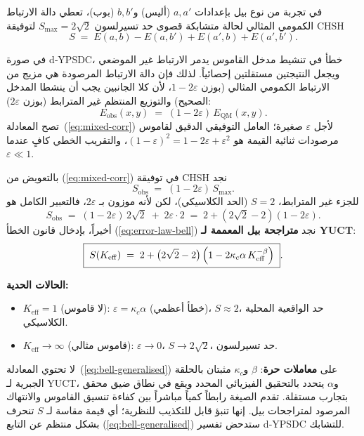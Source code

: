 \documentclass[12pt,a4paper]{article}
\theoremstyle{remark}
\begin{document}
	في تجربة من نوع بيل بإعدادات \(a,a'\) (أليس) و\(b,b'\) (بوب)، تعطي دالة الارتباط الكمومي المثالي لحالة متشابكة قصوى حد تسيرلسون \(S_{\max}=2\sqrt{2}\) لتوفيقة CHSH
	\[
	S \;=\; E(a,b)-E(a,b')+E(a',b)+E(a',b').
	\]
	
	في صورة d‑YPSDC، خطأ في تنشيط مدخل القاموس يدمر الارتباط غير الموضعي ويجعل النتيجتين مستقلتين إحصائياً. لذلك فإن دالة الارتباط المرصودة هي مزيج من الارتباط الكمومي المثالي (بوزن \(1-2\varepsilon\)، لأن كلا الجانبين يجب أن ينشطا المدخل الصحيح) والتوزيع المنتظم غير المترابط (بوزن \(2\varepsilon\)):
	\begin{equation}
		E_{\mathrm{obs}}(x,y) \;=\; (1-2\varepsilon)\,E_{\mathrm{QM}}(x,y).
		\label{eq:mixed-corr}
	\end{equation}
	تصح المعادلة~(\ref{eq:mixed-corr}) لأجل \(\varepsilon\) صغيرة؛ العامل التوفيقي الدقيق لقاموس مرصودات ثنائية القيمة هو \((1-\varepsilon)^2 = 1-2\varepsilon + \varepsilon^2\)، والتقريب الخطي كافٍ عندما \(\varepsilon\ll1\).
	
	بالتعويض من (\ref{eq:mixed-corr}) في توفيقة CHSH نجد
	\[
	S_{\mathrm{obs}} \;=\; (1-2\varepsilon)\,S_{\max}.
	\]
	للجزء غير المترابط، \(S=2\) (الحد الكلاسيكي)، لكن لأنه موزون بـ \(2\varepsilon\)، فالتعبير الكامل هو
	\begin{equation}
		S_{\mathrm{obs}} \;=\; (1-2\varepsilon)\,2\sqrt{2} \;+\; 2\varepsilon\cdot 2
		\;=\; 2 + (2\sqrt{2}-2)(1-2\varepsilon).
		\label{eq:Sobs-intermediate}
	\end{equation}
	أخيراً، بإدخال قانون الخطأ (\ref{eq:error-law-bell}) نجد \textbf{متراجحة بيل المعممة لـ YUCT}:
	\begin{equation}
		\boxed{\;
			S(K_{\mathrm{eff}}) \;=\; 2 + \bigl(2\sqrt{2}-2\bigr)\,
			\Bigl(1 - 2\kappa_c\alpha\,K_{\mathrm{eff}}^{-\beta}\Bigr)
			\;}.
		\label{eq:bell-generalised}
	\end{equation}
	
	\noindent
	\textbf{الحالات الحدية:}
	\begin{itemize}
		\item \(K_{\mathrm{eff}}=1\) (لا قاموس): \(\varepsilon = \kappa_c\alpha\) (خطأ أعظمي)، \(S \approx 2\)، حد الواقعية المحلية الكلاسيكي.
		\item \(K_{\mathrm{eff}}\to\infty\) (قاموس مثالي): \(\varepsilon\to0\)، \(S\to 2\sqrt{2}\)، حد تسيرلسون.
	\end{itemize}
	
	لا تحتوي المعادلة~(\ref{eq:bell-generalised}) على \textbf{معاملات حرة}: \(\beta\) و\(\kappa_c\) مثبتان بالحلقة الجبرية لـ YUCT، و\(\alpha\) يتحدد بالتحقيق الفيزيائي المحدد ويقع في نطاق ضيق محقق بتجارب مستقلة. تقدم الصيغة رابطاً كمياً مباشراً بين كفاءة تنسيق القاموس والانتهاك المرصود لمتراجحات بيل. إنها تنبؤ قابل للتكذيب للنظرية؛ أي قيمة مقاسة لـ \(S\) تنحرف بشكل منتظم عن التابع (\ref{eq:bell-generalised}) ستدحض تفسير d‑YPSDC للتشابك.
	
\end{document}
